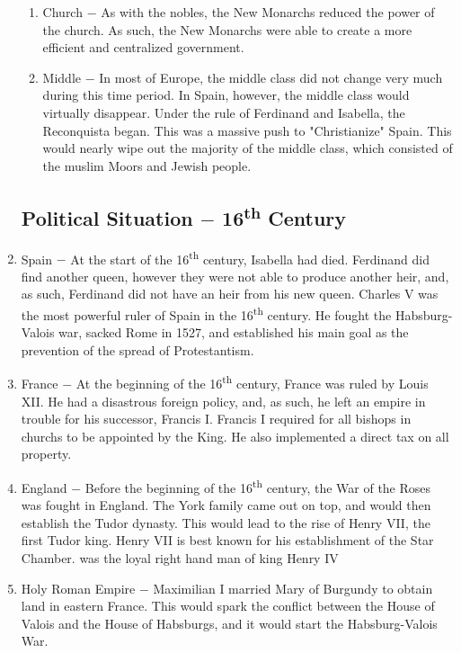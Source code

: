 \documentclass[12pt]{article}
\begin{document}
\begin{enumerate}
\begin{enumerate}[label=\arabic{*}.]
\item Church $-$ As with the nobles, the New Monarchs reduced the power of the church. As such, the New Monarchs were able to create a more efficient and centralized government.

\item Middle $-$ In most of Europe, the middle class did not change very much during this time period. In Spain, however, the middle class would virtually disappear. Under the rule of Ferdinand and Isabella, the Reconquista began. This was a massive push to "Christianize" Spain. This would nearly wipe out the majority of the middle class, which consisted of the muslim Moors and Jewish people.

\end{enumerate}

\subsection{Political Situation $-$ 16\textsuperscript{th} Century}

\setcounter{enumi}{39}

\item Spain $-$ At the start of the 16\textsuperscript{th} century, Isabella had died. Ferdinand did find another queen, however they were not able to produce another heir, and, as such, Ferdinand did not have an heir from his new queen. Charles V was the most powerful ruler of Spain in the 16\textsuperscript{th} century. He fought the Habsburg-Valois war, sacked Rome in 1527, and established his main goal as the prevention of the spread of Protestantism.

\item France $-$ At the beginning of the 16\textsuperscript{th} century, France was ruled by Louis XII. He had a disastrous foreign policy, and, as such, he left an empire in trouble for his successor, Francis I. Francis I required for all bishops in churchs to be appointed by the King. He also implemented a direct tax on all property. 

\item England $-$ Before the beginning of the 16\textsuperscript{th} century, the War of the Roses was fought in England. The York family came out on top, and would then establish the Tudor dynasty. This would lead to the rise of Henry VII, the first Tudor king. Henry VII is best known for his establishment of the Star Chamber.  was the loyal right hand man of king Henry IV

\item Holy Roman Empire $-$ Maximilian I married Mary of Burgundy to obtain land in eastern France. This would spark the conflict between the House of Valois and the House of Habsburgs, and it would start the Habsburg-Valois War.


\end{enumerate}
\end{document}
